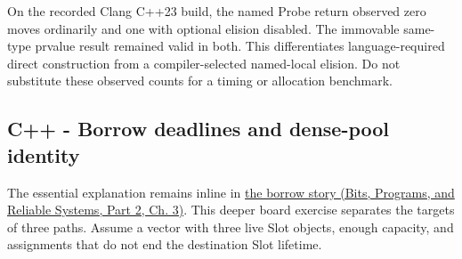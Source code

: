 On the recorded Clang C++23 build, the named Probe return observed zero moves ordinarily and one with optional elision disabled. The immovable same-type prvalue result remained valid in both. This differentiates language-required direct construction from a compiler-selected named-local elision. Do not substitute these observed counts for a timing or allocation benchmark.

\subsection{C++ - Borrow deadlines and dense-pool identity}\label{appendix-92ff77d4dfdc-c---borrow-deadlines-and-dense-pool-identity}

\hypertarget{appendix-92ff77d4dfdc-c---borrow-deadlines-and-dense-pool-identity}{}

The essential explanation remains inline in \href{../01-Bits-Programs-and-Reliable-Systems-P02/main.pdf\#01-foundations-i-ch003-when-a-valid-borrow-stops-naming-the-intended-thing}{the borrow story (Bits, Programs, and Reliable Systems, Part 2, Ch. 3)}. This deeper board exercise separates the targets of three paths. Assume a vector with three live Slot objects, enough capacity, and assignments that do not end the destination Slot lifetime.

